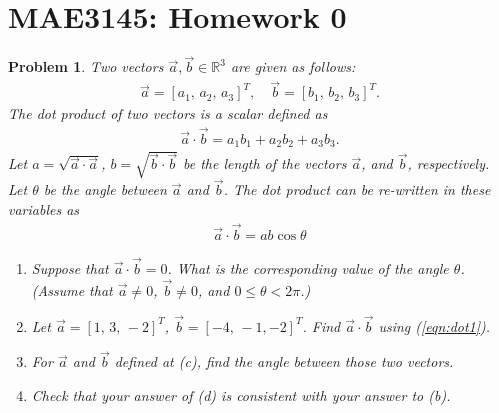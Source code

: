 \documentclass[10pt]{article}
\date{}
\newcommand{\refeqn}[1]{(\ref{eqn:#1})}
\renewcommand{\Re}{\ensuremath{\mathbb{R}}}
\theoremstyle{plain}\theorembodyfont{\normalfont}
\newtheorem{prob}{Problem}[section]
\newenvironment{subprob}%
{\renewcommand{\theenumi}{\alph{enumi}}\renewcommand{\labelenumi}{(\theenumi)}\begin{enumerate}}%
{\end{enumerate}}%
\begin{document}
\pagestyle{empty}
\section*{MAE3145: Homework 0}
\vspace*{-0.4cm}


\begin{prob}
Two vectors $\vec a,\vec b\in\Re^3$ are given as follows:
\begin{align*}
\vec a = [a_1,\,a_2,\, a_3]^T,\quad \vec b = [b_1,\,b_2,\, b_3]^T.
\end{align*}
The dot product of two vectors is a scalar defined as
\begin{align}
\vec a \cdot \vec b = a_1b_1+a_2b_2+a_3b_3.\label{eqn:dot1}
\end{align}
Let $a=\sqrt{\vec a \cdot \vec a}$,\; $b=\sqrt{\vec b \cdot \vec b}$\; be the length of the vectors $\vec a$, and $\vec b$, respectively. Let $\theta$ be the angle between $\vec a$ and $\vec b$. The dot product can be re-written in these variables as
\begin{align}
\vec a \cdot \vec b = a b \cos\theta
\end{align}

\begin{subprob}
\item Suppose that $\vec a\cdot\vec b =0$. What is the corresponding value of the angle $\theta$. (Assume that $\vec a\neq 0$, $\vec b\neq 0$, and $0\leq\theta < 2 \pi$.)
\item Let $\vec a = [1,\,3,\,-2]^T$, $\vec b =[-4,\,-1,-2]^T$. Find $\vec a \cdot \vec b$ using \refeqn{dot1}.
\item For $\vec a$ and $\vec b$ defined at (c), find the angle between those two vectors.
\item Check that your answer of (d) is consistent with your answer to (b).
\end{subprob}


\end{prob}
\end{document}
